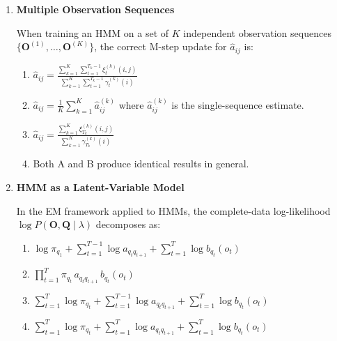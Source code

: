 \documentclass[12pt]{article}
\begin{document}
\begin{enumerate}[label=\textbf{Q\arabic*.}, leftmargin=*, itemsep=2em]
\begin{enumerate}[label=\Alph*.]
    \item The exponential can overflow or underflow in floating-point arithmetic
          before the sum is taken.
    \item The logarithm is undefined for negative values of $x_i$.
    \item Dynamic programming cannot be applied in log-space.
    \item Maximization cannot be converted to log-space.
\end{enumerate}

\item \textbf{Multiple Observation Sequences}

When training an HMM on a set of $K$ independent observation sequences
$\{\mathbf{O}^{(1)}, \dots, \mathbf{O}^{(K)}\}$, the correct M-step update for
$\hat{a}_{ij}$ is:

\begin{enumerate}[label=\Alph*.]
    \item $\displaystyle \hat{a}_{ij}
          = \frac{\displaystyle\sum_{k=1}^{K}\sum_{t=1}^{T_k-1}\xi_t^{(k)}(i,j)}
                 {\displaystyle\sum_{k=1}^{K}\sum_{t=1}^{T_k-1}\gamma_t^{(k)}(i)}$
    \item $\displaystyle \hat{a}_{ij}
          = \frac{1}{K}\sum_{k=1}^{K}\hat{a}_{ij}^{(k)}$
          where $\hat{a}_{ij}^{(k)}$ is the single-sequence estimate.
    \item $\displaystyle \hat{a}_{ij}
          = \frac{\displaystyle\sum_{k=1}^{K}\xi_{T_k}^{(k)}(i,j)}
                 {\displaystyle\sum_{k=1}^{K}\gamma_{T_k}^{(k)}(i)}$
    \item Both A and B produce identical results in general.
\end{enumerate}

\item \textbf{HMM as a Latent-Variable Model}

In the EM framework applied to HMMs, the complete-data log-likelihood
$\log P(\mathbf{O}, \mathbf{Q} \mid \lambda)$ decomposes as:

\begin{enumerate}[label=\Alph*.]
    \item $\displaystyle
          \log \pi_{q_1}
          + \sum_{t=1}^{T-1}\log a_{q_t q_{t+1}}
          + \sum_{t=1}^{T}\log b_{q_t}(o_t)$
    \item $\displaystyle
          \prod_{t=1}^{T} \pi_{q_t}\, a_{q_t q_{t+1}}\, b_{q_t}(o_t)$
    \item $\displaystyle
          \sum_{t=1}^{T}\log \pi_{q_t}
          + \sum_{t=1}^{T-1}\log a_{q_t q_{t+1}}
          + \sum_{t=1}^{T}\log b_{q_t}(o_t)$
    \item $\displaystyle
          \sum_{t=1}^{T}\log \pi_{q_t}
          + \sum_{t=1}^{T}\log a_{q_t q_{t+1}}
          + \sum_{t=1}^{T}\log b_{q_t}(o_t)$
\end{enumerate}


\end{enumerate}
\end{document}
